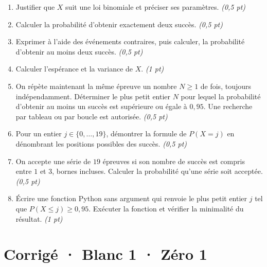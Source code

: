 \begin{enumerate}

\item Justifier que $X$ suit une loi binomiale et préciser ses paramètres. \hfill\textit{(0,5 pt)}

\item Calculer la probabilité d'obtenir exactement deux succès. \hfill\textit{(0,5 pt)}

\item Exprimer à l'aide des événements contraires, puis calculer, la probabilité d'obtenir au moins deux succès. \hfill\textit{(0,5 pt)}

\item Calculer l'espérance et la variance de $X$. \hfill\textit{(1 pt)}

\item On répète maintenant la même épreuve un nombre $N\ge1$ de fois, toujours indépendamment. Déterminer le plus petit entier $N$ pour lequel la probabilité d'obtenir au moins un succès est supérieure ou égale à $0{,}95$. Une recherche par tableau ou par boucle est autorisée. \hfill\textit{(0,5 pt)}

\item Pour un entier $j\in\{0,\ldots,19\}$, démontrer la formule de $P(X=j)$ en dénombrant les positions possibles des succès. \hfill\textit{(0,5 pt)}

\item On accepte une série de $19$ épreuves si son nombre de succès est compris entre $1$ et $3$, bornes incluses. Calculer la probabilité qu'une série soit acceptée. \hfill\textit{(0,5 pt)}

\item Écrire une fonction Python sans argument qui renvoie le plus petit entier $j$ tel que $P(X\le j)\ge0{,}95$. Exécuter la fonction et vérifier la minimalité du résultat. \hfill\textit{(1 pt)}

\end{enumerate}

\ifprof\clearpage

\section*{Corrigé · Blanc 1 · Zéro 1}\label{cor:5-1}

